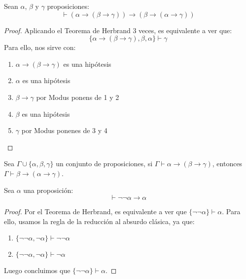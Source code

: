 \begin{prop}
    Sean $\alpha$, $\beta$ y $\gamma$ proposiciones:
    \begin{equation*}
        \vdash (\alpha\to(\beta\to\gamma))\to(\beta\to(\alpha\to\gamma))
    \end{equation*}
    \begin{proof}
        Aplicando el Teorema de Herbrand 3 veces, es equivalente a ver que:
        \begin{equation*}
            \{\alpha\to(\beta\to\gamma),\beta,\alpha\}\vdash \gamma
        \end{equation*}
        Para ello, nos sirve con:
        \begin{enumerate}
            \item $\alpha\to(\beta\to\gamma)$ es una hipótesis
            \item $\alpha$ es una hipótesis
            \item $\beta\to \gamma$ por Modus ponens de 1 y 2
            \item $\beta$ es una hipótesis
            \item $\gamma$ por Modus ponenes de 3 y 4
        \end{enumerate}
    \end{proof}
\end{prop}

\begin{coro}
    Sea $\Gamma\cup\{\alpha,\beta,\gamma\}$ un conjunto de proposiciones, si $\Gamma\vdash \alpha\to(\beta\to\gamma)$, entonces $\Gamma\vdash \beta\to(\alpha\to\gamma)$.
\end{coro}

\begin{prop}
    Sea $\alpha$ una proposición:
    \begin{equation*}
        \vdash \lnot\lnot\alpha\to \alpha
    \end{equation*}
    \begin{proof}
        Por el Teorema de Herbrand, es equivalente a ver que $\{\lnot\lnot\alpha\}\vdash \alpha$. Para ello, usamos la regla de la reducción al absurdo clásica, ya que:
        \begin{enumerate}
            \item $\{\lnot\lnot\alpha,\lnot\alpha\}\vdash \lnot\lnot\alpha$
            \item $\{\lnot\lnot\alpha,\lnot\alpha\}\vdash \lnot\alpha$
        \end{enumerate}
        Luego concluimos que $\{\lnot\lnot\alpha\}\vdash \alpha$.
    \end{proof}
\end{prop}

